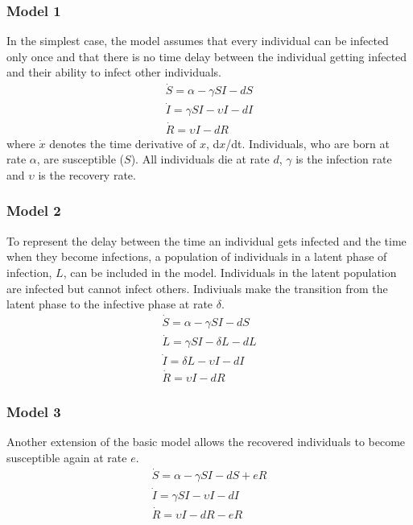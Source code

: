 \documentclass[a4paper]{report}
\begin{document}
\subsubsection*{Model 1}
In the simplest case, the model assumes that every individual can be infected only once and that there is no time delay between the individual getting infected and their ability to infect other individuals.
\begin{gather*}
\dot S = \alpha - \gamma SI - dS \\
\dot I = \gamma SI - \upsilon I - dI \\
\dot R = \upsilon I - dR
\end{gather*}
where $\dot x$ denotes the time derivative of $x$, d$x$/dt. Individuals, who are born at rate $\alpha$, are susceptible ($S$). All individuals die at rate $d$, $\gamma$ is the infection rate and $\upsilon$ is the recovery rate.

\subsubsection*{Model 2}
To represent the delay between the time an individual gets infected and the time when they become infections, a population of individuals in a latent phase of infection, $L$, can be included in the model. Individuals in the latent population are infected but cannot infect others. Indiviuals make the transition from the latent phase to the infective phase at rate $\delta$.
\begin{gather*}
\dot S = \alpha - \gamma SI - dS \\
\dot L = \gamma SI - \delta L - dL \\
\dot I = \delta L - \upsilon I - dI \\
\dot R = \upsilon I - dR
\end{gather*}

\subsubsection*{Model 3}
Another extension of the basic model allows the recovered individuals to become susceptible again at rate $e$.
\begin{gather*}
\dot S = \alpha - \gamma SI - dS + eR\\
\dot I = \gamma SI - \upsilon I - dI \\
\dot R = \upsilon I - dR - eR
\end{gather*}
\end{document}
